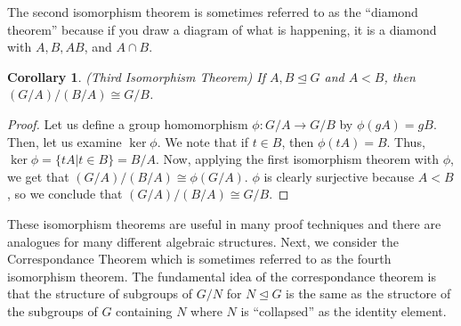 \documentclass[11pt,leqno,oneside]{amsart}
\newcommand{\subgroup}{\mathrel{<}}
\newcommand{\normsubgroup}{\mathrel{\unlhd}}
\newcommand{\isom}{\mathrel{\cong}}
\newtheorem{cor}[thm]{Corollary}
\theoremstyle{definition}
\numberwithin{equation}{section}
\begin{document}
The second isomorphism theorem is sometimes referred to as the ``diamond
theorem'' because if you draw a diagram of what is happening, it is a diamond
with $A, B, AB$, and $A \cap B$.
\begin{cor}
    (Third Isomorphism Theorem) If $A,B \normsubgroup G$ and $A \subgroup B$, then $(G/A)/(B/A) \isom G/B$.
\end{cor}
\begin{proof}
    Let us define a group homomorphism $\phi: G/A \to G/B$ by $\phi(gA) = gB$.
    Then, let us examine $\ker \phi$. We note that if $t \in B$,
    then $\phi(tA) = B$. Thus, $\ker \phi = \{tA | t \in B\} = B/A$. Now, applying the first
    isomorphism theorem with $\phi$, we get that $(G/A)/(B/A) \isom \phi(G/A)$.
    $\phi$ is clearly surjective because $A \subgroup B$, so we conclude that
    $(G/A)/(B/A) \isom G/B$.
\end{proof}

These isomorphism theorems are useful in many proof techniques and there are
analogues for many different algebraic structures. Next, we consider the
Correspondance Theorem which is sometimes referred to as the fourth isomorphism
theorem. The fundamental idea of the correspondance theorem is that the
structure of subgroups of $G/N$ for $N \normsubgroup G$ is the same as the
structore of the subgroups of $G$ containing $N$ where $N$ is ``collapsed'' as
the identity element.
\end{document}
